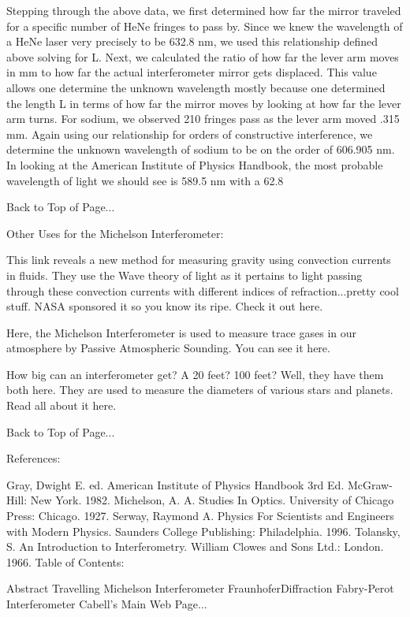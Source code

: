     Stepping through the above data, we first determined how far the mirror traveled for a specific number of HeNe fringes to pass by.  Since we knew the wavelength of a HeNe laser very precisely to be 632.8 nm, we used this relationship defined above solving for L.  Next, we calculated the ratio of how far the lever arm moves in mm to how far the actual interferometer mirror gets displaced.  This value allows one determine the unknown wavelength mostly because one determined the length L in terms of how far the mirror moves by looking at how far the lever arm turns.   For sodium, we observed 210 fringes pass as the lever arm moved .315 mm.   Again using our relationship for orders of constructive interference, we determine the unknown wavelength of sodium to be on the order of 606.905 nm.  In looking at the American Institute of Physics Handbook, the most probable wavelength of light we should see is 589.5 nm with a 62.8%

Back to Top of Page...

Other Uses for the Michelson Interferometer:

This link reveals a new method for measuring gravity using convection currents in fluids.  They use the Wave theory of light as it pertains to light passing through these convection currents with different indices of refraction...pretty cool stuff.   NASA sponsored it so you know its ripe.  Check it out here.

 

Here, the Michelson Interferometer is used to measure trace gases in our atmosphere by Passive Atmospheric Sounding.  You can see it here.

 

How big can an interferometer get?  A 20 feet? 100 feet?  Well, they have them both here.  They are used to measure the diameters of various stars and planets.   Read all about it here.

Back to Top of Page...

References:

Gray, Dwight E. ed.  American Institute of Physics Handbook 3rd Ed.  McGraw-Hill: New York. 1982. 
Michelson, A. A.  Studies In Optics.   University of Chicago Press:  Chicago.  1927.
Serway, Raymond A.  Physics For Scientists and Engineers with Modern Physics.  Saunders College Publishing:   Philadelphia.  1996. 
Tolansky, S.  An Introduction to Interferometry. William Clowes and Sons Ltd.:  London.  1966.
Table of Contents:

Abstract
Travelling Michelson Interferometer
FraunhoferDiffraction
Fabry-Perot Interferometer
Cabell's Main Web Page...